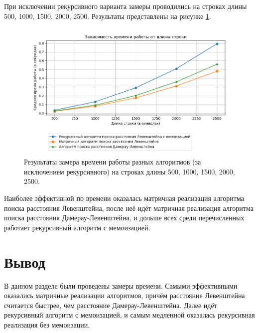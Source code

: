 При исключении рекурсивного варианта замеры проводились на строках длины 500, 1000, 1500, 2000, 2500. Результаты представлены на рисунке \ref{fig:res2}.

\begin{figure}[h!]
	\centering
	\includegraphics[width=1\textwidth]{tex_parts/research2.png}
	\caption{\label{fig:res2} Результаты замера времени работы разных алгоритмов (за исключением рекурсивного) на строках длины 500, 1000, 1500, 2000, 2500.}
\end{figure}

Наиболее эффективной по времени оказалась матричная реализация алгоритма поиска расстояния Левенштейна, после неё идёт матричная реализация алгоритма поиска расстояния Дамерау-Левенштейна, и дольше всех среди перечисленных работает рекурсивный алгоритм с мемоизацией.

\section{Вывод}

В данном разделе были проведены замеры времени. Самыми эффективными оказались матричные реализации алгоритмов, причём расстояние Левенштейна считается быстрее, чем расстояние Дамерау-Левенштейна. Далее идёт рекурсивный алгоритм с мемоизацией, и самым медленной оказалась рекурсивная реализация без мемоизации.

